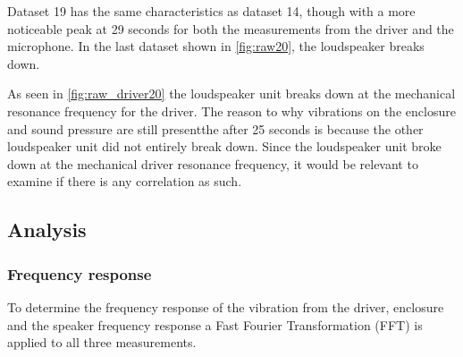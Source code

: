 Dataset 19 has the same characteristics as dataset 14, though with a more noticeable peak at 29 seconds for both the measurements from the driver and the microphone. In the last dataset shown in \autoref{fig:raw20}, the loudspeaker breaks down.


%	
%	
%	

As seen in \autoref{fig:raw_driver20} the loudspeaker unit breaks down at the mechanical resonance frequency for the driver. The reason to why vibrations on the enclosure and sound pressure are still presentthe  after 25 seconds is because the other loudspeaker unit did not entirely break down. Since the loudspeaker unit broke down at the mechanical driver resonance frequency, it would be relevant to examine if there is any correlation as such.



\subsection{Analysis}

\subsubsection{Frequency response}

To determine the frequency response of the vibration from the driver, enclosure and the speaker frequency response a Fast Fourier Transformation (FFT) is applied to all three measurements.

